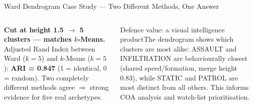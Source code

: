 \documentclass[aspectratio=169,10pt,t]{beamer}
\begin{document}
\begin{frame}{Ward Dendrogram Case Study --- Two Different Methods, One Answer}
\begin{columns}[T]
\begin{rbox}\scriptsize\textbf{Cut at height 1.5 $\to$ 5 clusters --- matches $k$-Means.} Adjusted Rand Index between Ward ($k=5$) and $k$-Means ($k=5$): \textbf{ARI = 0.847} (1 = identical, 0 = random). Two completely different methods agree $\Rightarrow$ strong evidence for five real archetypes.\end{rbox}
\begin{cbox}[ISSAnavy]{Defence value: a visual intelligence product}\scriptsize The dendrogram shows which clusters are most alike: ASSAULT and INFILTRATION are behaviourally closest (shared speed/formation, merge height 0.83), while STATIC and PATROL are most distinct from all others. This informs COA analysis and watch-list prioritisation.\end{cbox}
\end{columns}
\end{frame}
\end{document}
